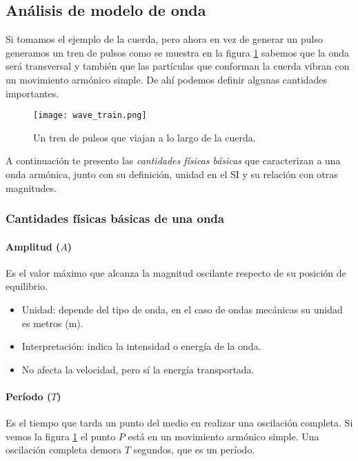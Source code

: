 \subsection{Análisis de modelo de onda}
\label{sec:waves_analisys}

Si tomamos el ejemplo de la cuerda, pero ahora en vez de generar un pulso generamos un tren de pulsos como se muestra en la figura \ref{fig:wave_train} sabemos que la onda será transversal y también que las partículas que conforman la cuerda vibran con un movimiento armónico simple. De ahí podemos definir algunas cantidades importantes.

\begin{figure}[ht]
  \centering
  \texttt{[image: wave\_train.png]}
  \caption{Un tren de pulsos que viajan a lo largo de la cuerda.}
  \label{fig:wave_train}
\end{figure}

A continuación te presento las \textit{cantidades físicas básicas} que caracterizan a una onda armónica, junto con su definición, unidad en el SI y su relación con otras magnitudes.

\subsubsection{Cantidades físicas básicas de una onda}
\label{sec:waves_basic_quantities}

\paragraph{Amplitud (\(A\))}

Es el valor máximo que alcanza la magnitud oscilante respecto de su posición de equilibrio.

\begin{itemize}
  \item Unidad: depende del tipo de onda, en el caso de ondas mecánicas su unidad es metros (\(\si{\meter}\)).
  \item Interpretación: indica la intensidad o energía de la onda.
  \item No afecta la velocidad, pero sí la energía transportada.
\end{itemize}

\paragraph{Período (\(T\))}

Es el tiempo que tarda un punto del medio en realizar una oscilación completa. Si vemos la figura \ref{fig:wave_train} el punto \(P\) está en un movimiento armónico simple. Una oscilación completa demora \(T\) segundos, que es un período. 

